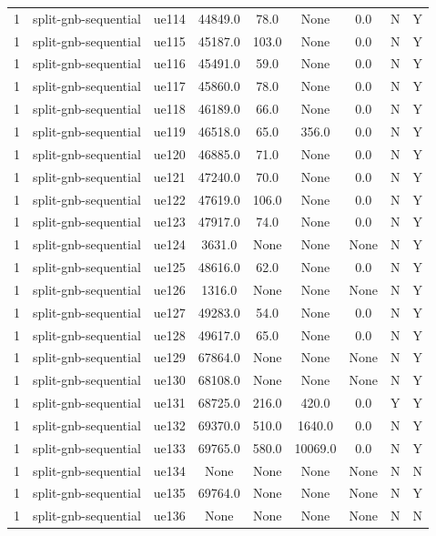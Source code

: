 \begin{table}[ht]
\begin{tabular}{|c|c|c|c|c|c|c|c|c|}
1 & split-gnb-sequential & ue114 & 44849.0 & 78.0 & None & 0.0 & N & Y \\
1 & split-gnb-sequential & ue115 & 45187.0 & 103.0 & None & 0.0 & N & Y \\
1 & split-gnb-sequential & ue116 & 45491.0 & 59.0 & None & 0.0 & N & Y \\
1 & split-gnb-sequential & ue117 & 45860.0 & 78.0 & None & 0.0 & N & Y \\
1 & split-gnb-sequential & ue118 & 46189.0 & 66.0 & None & 0.0 & N & Y \\
1 & split-gnb-sequential & ue119 & 46518.0 & 65.0 & 356.0 & 0.0 & N & Y \\
1 & split-gnb-sequential & ue120 & 46885.0 & 71.0 & None & 0.0 & N & Y \\
1 & split-gnb-sequential & ue121 & 47240.0 & 70.0 & None & 0.0 & N & Y \\
1 & split-gnb-sequential & ue122 & 47619.0 & 106.0 & None & 0.0 & N & Y \\
1 & split-gnb-sequential & ue123 & 47917.0 & 74.0 & None & 0.0 & N & Y \\
1 & split-gnb-sequential & ue124 & 3631.0 & None & None & None & N & Y \\
1 & split-gnb-sequential & ue125 & 48616.0 & 62.0 & None & 0.0 & N & Y \\
1 & split-gnb-sequential & ue126 & 1316.0 & None & None & None & N & Y \\
1 & split-gnb-sequential & ue127 & 49283.0 & 54.0 & None & 0.0 & N & Y \\
1 & split-gnb-sequential & ue128 & 49617.0 & 65.0 & None & 0.0 & N & Y \\
1 & split-gnb-sequential & ue129 & 67864.0 & None & None & None & N & Y \\
1 & split-gnb-sequential & ue130 & 68108.0 & None & None & None & N & Y \\
1 & split-gnb-sequential & ue131 & 68725.0 & 216.0 & 420.0 & 0.0 & Y & Y \\
1 & split-gnb-sequential & ue132 & 69370.0 & 510.0 & 1640.0 & 0.0 & N & Y \\
1 & split-gnb-sequential & ue133 & 69765.0 & 580.0 & 10069.0 & 0.0 & N & Y \\
1 & split-gnb-sequential & ue134 & None & None & None & None & N & N \\
1 & split-gnb-sequential & ue135 & 69764.0 & None & None & None & N & Y \\
1 & split-gnb-sequential & ue136 & None & None & None & None & N & N \\

\end{tabular}
\end{table}
